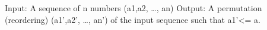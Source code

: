 Input: A sequence of n numbers (a1,a2, \dots, an)
Output: A permutation (reordering) (a1',a2', \dots, an') of the input sequence such
that a1'<= a.